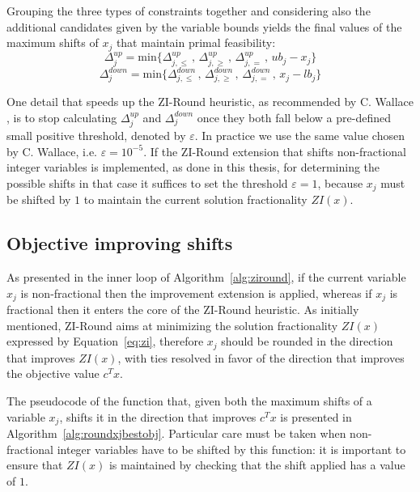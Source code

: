 \documentclass[a4paper,12pt,twoside]{scrbook}
\begin{document}
Grouping the three types of constraints together and considering also the additional candidates given by the variable bounds yields the final values of the maximum shifts of $x_j$ that maintain primal feasibility:
\begin{equation}
	\Delta_{j}^{up} = \text{min} \{\Delta_{j,\leq}^{up} \,,\, \Delta_{j,\geq}^{up} \,,\, \Delta_{j,=}^{up} \,,\, ub_j - x_j\}
\end{equation}
\begin{equation}
	\Delta_{j}^{down} = \text{min} \{\Delta_{j,\leq}^{down} \,,\, \Delta_{j,\geq}^{down} \,,\, \Delta_{j,=}^{down} \,,\, x_j - lb_j\}
\end{equation}

One detail that speeds up the ZI-Round heuristic, as recommended by C. Wallace \cite{wallace2010}, is to stop calculating $\Delta_{j}^{up}$ and $\Delta_{j}^{down}$ once they both fall below a pre-defined small positive threshold, denoted by $\varepsilon$. In practice we use the same value chosen by C. Wallace, i.e. $\varepsilon = 10^{-5}$. If the ZI-Round extension that shifts non-fractional integer variables is implemented, as done in this thesis, for determining the possible shifts in that case it suffices to set the threshold $\varepsilon = 1$, because $x_j$ must be shifted by $1$ to maintain the current solution fractionality $ZI(x)$. \par

\subsection{Objective improving shifts}
As presented in the inner loop of Algorithm~\ref{alg:ziround}, if the current variable $x_j$ is non-fractional then the improvement extension is applied, whereas if $x_j$ is fractional then it enters the core of the ZI-Round heuristic. As initially mentioned, ZI-Round aims at minimizing the solution fractionality $ZI(x)$ expressed by Equation~\ref{eq:zi}, therefore $x_j$ should be rounded in the direction that improves $ZI(x)$, with ties resolved in favor of the direction that improves the objective value $c^Tx$. \par
The pseudocode of the function that, given both the maximum shifts of a variable $x_j$, shifts it in the direction that improves $c^Tx$ is presented in Algorithm~\ref{alg:roundxjbestobj}. Particular care must be taken when non-fractional integer variables have to be shifted by this function: it is important to ensure that $ZI(x)$ is maintained by checking that the shift applied has a value of $1$. \par
\end{document}
